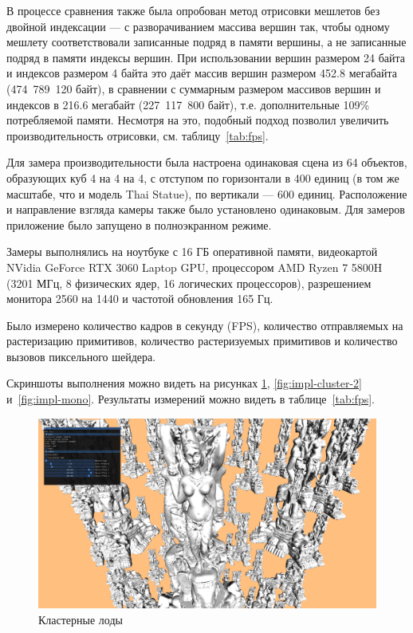 В процессе сравнения также была опробован метод отрисовки мешлетов без двойной индексации --- с разворачиванием массива вершин так, чтобы одному мешлету соответствовали записанные подряд в памяти вершины, а не записанные подряд в памяти индексы вершин.
При использовании вершин размером 24 байта и индексов размером 4 байта это даёт массив вершин размером 452.8 мегабайта (474~789~120 байт), в сравнении с суммарным размером массивов вершин и индексов в 216.6 мегабайт (227~117~800 байт), т.е. дополнительные 109\% потребляемой памяти.
Несмотря на это, подобный подход позволил увеличить производительность отрисовки, см. таблицу~\ref{tab:fps}.

Для замера производительности была настроена одинаковая сцена из 64 объектов, образующих куб 4 на 4 на 4, с отступом по горизонтали в 400 единиц (в том же масштабе, что и модель Thai Statue), по вертикали --- 600 единиц.
Расположение и направление взгляда камеры также было установлено одинаковым.
Для замеров приложение было запущено в полноэкранном режиме.

Замеры выполнялись на ноутбуке с 16 ГБ оперативной памяти, видеокартой NVidia GeForce RTX 3060 Laptop GPU, процессором AMD Ryzen 7 5800H (3201 МГц, 8 физических ядер, 16 логических процессоров), разрешением монитора 2560 на 1440 и частотой обновления 165 Гц.

Было измерено количество кадров в секунду (FPS), количество отправляемых на растеризацию примитивов, количество растеризуемых примитивов и количество вызовов пиксельного шейдера.

Скриншоты выполнения можно видеть на рисунках \ref{fig:impl-cluster-1}, \ref{fig:impl-cluster-2} и~\ref{fig:impl-mono}.
Результаты измерений можно видеть в таблице~\ref{tab:fps}.

\begin{figure}[h]
    \centering
    \includegraphics[width=\textwidth]{impl1.png}
    \caption{Кластерные лоды}
    \label{fig:impl-cluster-1}
\end{figure}

